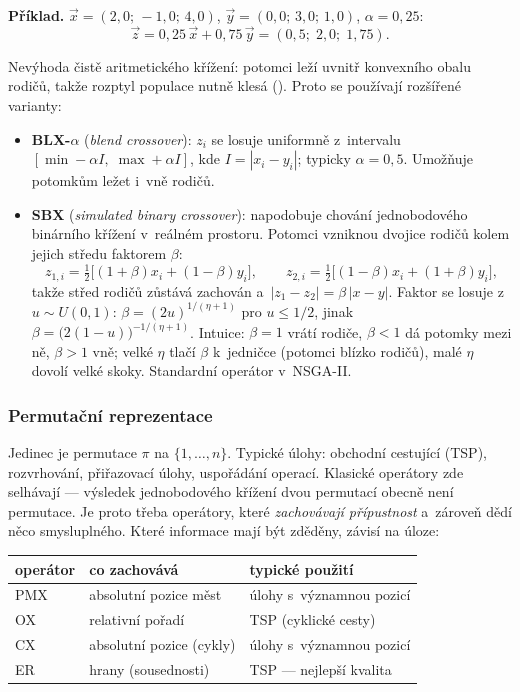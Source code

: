 \documentclass[11pt,a4paper]{article}
\theoremstyle{definition}
\begin{document}
\textbf{Příklad.} $\vec x = (2{,}0;\, -1{,}0;\, 4{,}0)$,
$\vec y = (0{,}0;\, 3{,}0;\, 1{,}0)$, $\alpha = 0{,}25$:
\[
\vec z = 0{,}25\,\vec x + 0{,}75\,\vec y = (0{,}5;\; 2{,}0;\; 1{,}75).
\]

Nevýhoda čistě aritmetického křížení: potomci leží uvnitř konvexního obalu
rodičů, takže rozptyl populace nutně klesá (). Proto se používají
rozšířené varianty:
\begin{itemize}
\item \textbf{BLX-$\alpha$} (\emph{blend crossover}): $z_i$ se losuje uniformně
  z~intervalu $[\min - \alpha I,\; \max + \alpha I]$, kde
  $I = |x_i - y_i|$; typicky $\alpha = 0{,}5$. Umožňuje potomkům ležet
  i~vně rodičů.
\item \textbf{SBX} (\emph{simulated binary crossover}): napodobuje chování
  jednobodového binárního křížení v~reálném prostoru. Potomci vzniknou
   dvojice rodičů kolem jejich středu faktorem $\beta$:
  \[
  z_{1,i} = \tfrac12\big[(1+\beta)x_i + (1-\beta)y_i\big],\qquad
  z_{2,i} = \tfrac12\big[(1-\beta)x_i + (1+\beta)y_i\big],
  \]
  takže střed rodičů zůstává zachován a~$|z_1 - z_2| = \beta\,|x - y|$.
  Faktor se losuje z~$u \sim U(0,1)$: $\beta = (2u)^{1/(\eta+1)}$ pro
  $u \le 1/2$, jinak $\beta = \big(2(1-u)\big)^{-1/(\eta+1)}$.
  Intuice: $\beta = 1$ vrátí rodiče, $\beta < 1$ dá potomky mezi ně,
  $\beta > 1$ vně; velké $\eta$ tlačí $\beta$ k~jedničce (potomci blízko
  rodičů), malé $\eta$ dovolí velké skoky. Standardní operátor v~NSGA-II.
\end{itemize}

\subsubsection{Permutační reprezentace}

Jedinec je permutace $\pi$ na $\{1,\dots,n\}$. Typické úlohy: obchodní cestující
(TSP), rozvrhování, přiřazovací úlohy, uspořádání operací. Klasické operátory
zde selhávají --- výsledek jednobodového křížení dvou permutací obecně není
permutace. Je proto třeba operátory, které \emph{zachovávají přípustnost}
a~zároveň dědí něco smysluplného. Které informace mají být zděděny, závisí
na úloze:

\begin{center}
\begin{tabular}{@{}lll@{}}
\toprule
\textbf{operátor} & \textbf{co zachovává} & \textbf{typické použití} \\
\midrule
PMX & absolutní pozice měst & úlohy s~významnou pozicí \\
OX & relativní pořadí & TSP (cyklické cesty) \\
CX & absolutní pozice (cykly) & úlohy s~významnou pozicí \\
ER & hrany (sousednosti) & TSP --- nejlepší kvalita \\
\bottomrule
\end{tabular}
\end{center}
\end{document}
